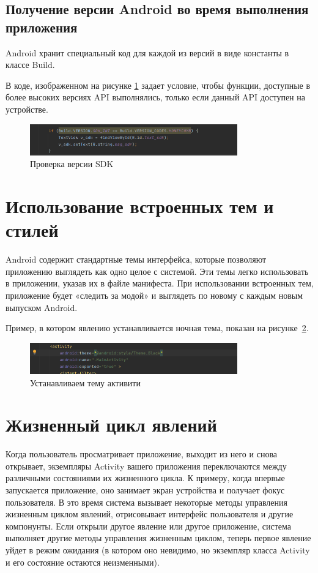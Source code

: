 \subsection{Получение версии Android во время выполнения приложения}
Android хранит специальный код для каждой из версий в виде константы в
классе Build.\par
В коде, изображенном на рисунке \ref{fig:code:vsdk} задает условие,
чтобы функции, доступные в более высоких версиях API выполнялись,
только если данный API доступен на устройстве.
\begin{figure}[h!tp]
	\centering
	\includegraphics[width=0.8\textwidth]{Screenshot from 2023-02-20 20-37-17.png}
	\caption{Проверка версии SDK}
	\label{fig:code:vsdk}
\end{figure}

\section{Использование встроенных тем и стилей}
Android содержит стандартные темы интерфейса, которые позволяют
приложению выглядеть как одно целое с системой. Эти темы легко
использовать в приложении, указав их в файле манифеста. При
использовании встроенных тем, приложение будет «следить за модой» и
выглядеть по новому с каждым новым выпуском Android.\par
Пример, в котором явлению устанавливается ночная тема,
показан на рисунке~\ref{fig:manifest:theme}.
\begin{figure}[h!tp]
	\centering
	\includegraphics[width=0.8\textwidth]{Screenshot from 2023-02-20 21-00-16.png}
	\caption{Устанавливаем тему активити}
	\label{fig:manifest:theme}
\end{figure}

\section{Жизненный цикл явлений}
Когда пользователь просматривает приложение, выходит из него и снова
открывает, экземпляры Activity вашего приложения переключаются между
различными состояниями их жизненного цикла. К примеру, когда впервые
запускается приложение, оно занимает экран устройства и получает фокус
пользователя. В это время система вызывает некоторые методы управления
жизненным циклом явлений, отрисовывает интерфейс пользователя и другие
компонунты. Если открыли другое явление или другое приложение, система
выполняет другие методы управления жизненным циклом, теперь первое явление
уйдет в режим ожидания (в котором оно невидимо, но экземпляр класса
Activity и его состояние остаются неизменными).

